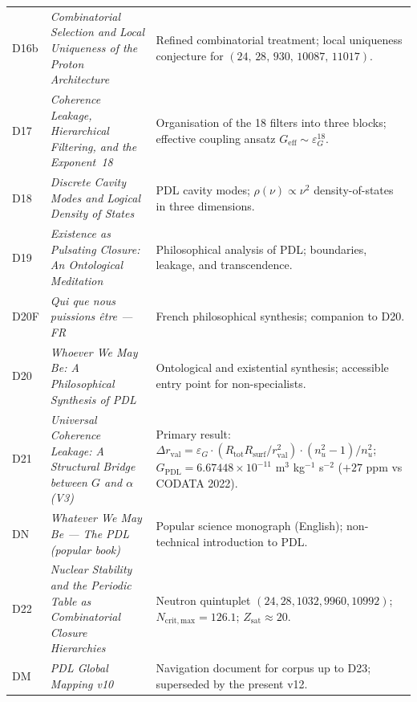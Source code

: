 \documentclass[11pt,a4paper]{article}
\theoremstyle{plain}
\theoremstyle{definition}
\theoremstyle{remark}
\newcommand{\quintuplet}{(24,\,28,\,930,\,10087,\,11017)}
\newcommand{\Geff}{G_{\mathrm{eff}}}
\newcommand{\GPDL}{G_{\mathrm{PDL}}}
\newcommand{\epsG}{\varepsilon_G}
\newcommand{\rval}{r_{\mathrm{val}}}
\begin{document}
\begin{longtable}{@{}L{1.3cm}L{3.8cm}L{8.0cm}@{}}
D16b & \textit{Combinatorial Selection and Local Uniqueness of the Proton Architecture}~\citep{D16b} & Refined combinatorial treatment; local uniqueness conjecture for $\quintuplet$. \\[0.3em]

D17 & \textit{Coherence Leakage, Hierarchical Filtering, and the Exponent~18}~\citep{D17} & Organisation of the 18 filters into three blocks; effective coupling ansatz $\Geff\sim\epsG^{18}$. \\[0.3em]

D18 & \textit{Discrete Cavity Modes and Logical Density of States}~\citep{D18} & PDL cavity modes; $\rho(\nu)\propto\nu^2$ density-of-states in three dimensions. \\[0.3em]

D19 & \textit{Existence as Pulsating Closure: An Ontological Meditation}~\citep{D19} & Philosophical analysis of PDL; boundaries, leakage, and transcendence. \\[0.3em]

D20F & \textit{Qui que nous puissions \^etre — FR}~\citep{D20F} & French philosophical synthesis; companion to D20. \\[0.3em]

D20 & \textit{Whoever We May Be: A Philosophical Synthesis of PDL}~\citep{D20} & Ontological and existential synthesis; accessible entry point for non-specialists. \\[0.3em]

D21 & \textit{Universal Coherence Leakage: A Structural Bridge between $G$ and $\alpha$ (V3)}~\citep{D21} & \textcolor{proofblue}{Primary result}: $\Delta\rval = \epsG\cdot(R_{\mathrm{tot}}R_{\mathrm{surf}}/\rval^2)\cdot(n_u^2-1)/n_u^2$; $\GPDL = 6.67448\times 10^{-11}$ m$^3$ kg$^{-1}$ s$^{-2}$ ($+27$ ppm vs CODATA 2022). \\[0.3em]

DN & \textit{Whatever We May Be — The PDL (popular book)}~\citep{DN} & Popular science monograph (English); non-technical introduction to PDL. \\[0.3em]

D22 & \textit{Nuclear Stability and the Periodic Table as Combinatorial Closure Hierarchies}~\citep{D22} & Neutron quintuplet $(24,28,1032,9960,10992)$; $N_{\mathrm{crit,max}}=126.1$; $Z_{\mathrm{sat}}\approx 20$. \\[0.3em]

DM & \textit{PDL Global Mapping v10}~\citep{D_Map_v10} & Navigation document for corpus up to D23; superseded by the present v12. \\[0.3em]


\end{longtable}
\end{document}
